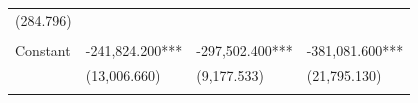 \documentclass[]{book}
\begin{document}
\begin{longtable}[]{@{}llll@{}}
\begin{minipage}[t]{0.22\columnwidth}
(284.796)\strut
\end{minipage}\tabularnewline
\begin{minipage}[t]{0.18\columnwidth}\raggedright\strut
\strut
\end{minipage} & \begin{minipage}[t]{0.24\columnwidth}\raggedright\strut
\strut
\end{minipage} & \begin{minipage}[t]{0.24\columnwidth}\raggedright\strut
\strut
\end{minipage} & \begin{minipage}[t]{0.22\columnwidth}\raggedright\strut
\strut
\end{minipage}\tabularnewline
\begin{minipage}[t]{0.18\columnwidth}\raggedright\strut
Constant\strut
\end{minipage} & \begin{minipage}[t]{0.24\columnwidth}\raggedright\strut
-241,824.200***\strut
\end{minipage} & \begin{minipage}[t]{0.24\columnwidth}\raggedright\strut
-297,502.400***\strut
\end{minipage} & \begin{minipage}[t]{0.22\columnwidth}\raggedright\strut
-381,081.600***\strut
\end{minipage}\tabularnewline
\begin{minipage}[t]{0.18\columnwidth}\raggedright\strut
\strut
\end{minipage} & \begin{minipage}[t]{0.24\columnwidth}\raggedright\strut
(13,006.660)\strut
\end{minipage} & \begin{minipage}[t]{0.24\columnwidth}\raggedright\strut
(9,177.533)\strut
\end{minipage} & \begin{minipage}[t]{0.22\columnwidth}\raggedright\strut
(21,795.130)\strut
\end{minipage}\tabularnewline
\begin{minipage}[t]{0.18\columnwidth}\raggedright\strut
\strut
\end{minipage} & \begin{minipage}[t]{0.24\columnwidth}\raggedright\strut
\strut
\end{minipage} & \begin{minipage}[t]{0.24\columnwidth}\raggedright\strut
\strut
\end{minipage} & \begin{minipage}[t]{0.22\columnwidth}\raggedright\strut

\end{minipage}
\end{longtable}
\end{document}

